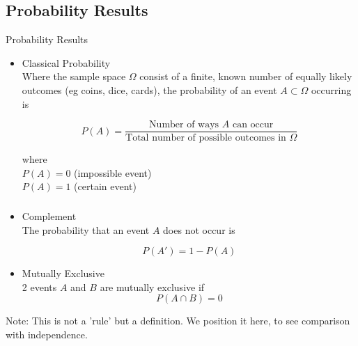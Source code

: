 \documentclass[t,xcolor=pdftex,dvipsnames,table]{beamer}
\begin{document}
\subsection[]{Probability Results}
\begin{frame}[fragile]{Probability Results}

\begin{itemize}
\item 
Classical Probability \\
Where the sample space $\Omega$ consist of a finite, known number of equally likely outcomes (eg coins, dice, cards), 
the probability of an event $A \subset \Omega$ occurring is 

\[\boxed{ P(A) = \frac{\mbox{Number of ways $A$ can occur}}{\mbox{Total number of possible outcomes in } \Omega} }  \] 

\vspace{.5cm}
where \\
$P(A) = 0$ (impossible event)  \\
$P(A) = 1$ (certain event) \\
\end{itemize}
\end{frame}
 
\begin{frame}\frametitle{}  
\begin{itemize}
\item
Complement \\
The probability that an event $A$ does not occur is

\[ \boxed{ P(A') = 1 - P(A)  }\]

\vspace{.5cm}
\item Mutually Exclusive \\
2 events $A$ and $B$ are mutually exclusive if
\[ \boxed{ P(A \cap B) = 0 } \]

\vspace{.25cm}
\begin{center}
\end{center}
\end{itemize}

Note: This is not a 'rule' but a definition. We position it here, to see comparison with independence.
\end{frame} 
\end{document}
